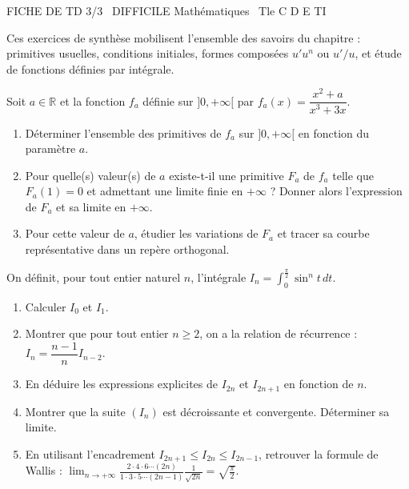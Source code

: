 \documentclass[11pt]{article}
\begin{document}
\begin{tcolorbox}[enhanced,colback=popink,colframe=popink,arc=10pt,boxrule=0pt,left=12pt,right=12pt,top=9pt,bottom=9pt]
{\color{white}\popxbold\small FICHE DE TD 3/3 \textbullet\ DIFFICILE \hfill Mathématiques \textbullet\ Tle C D E TI\par}
\end{tcolorbox}
\vspace{4pt}
Ces exercices de synthèse mobilisent l'ensemble des savoirs du chapitre : primitives usuelles, conditions initiales, formes composées $u'u^n$ ou $u'/u$, et étude de fonctions définies par intégrale.

\begin{exercice}
Soit $a \in \mathbb{R}$ et la fonction $f_a$ définie sur $]0, +\infty[$ par $f_a(x) = \dfrac{x^2 + a}{x^3 + 3x}$.
\begin{enumerate}
    \item Déterminer l'ensemble des primitives de $f_a$ sur $]0, +\infty[$ en fonction du paramètre $a$.
    \item Pour quelle(s) valeur(s) de $a$ existe-t-il une primitive $F_a$ de $f_a$ telle que $F_a(1) = 0$ et admettant une limite finie en $+\infty$ ? Donner alors l'expression de $F_a$ et sa limite en $+\infty$.
    \item Pour cette valeur de $a$, étudier les variations de $F_a$ et tracer sa courbe représentative dans un repère orthogonal.
\end{enumerate}
\end{exercice}

\begin{exercice}
On définit, pour tout entier naturel $n$, l'intégrale $I_n = \displaystyle\int_0^{\frac{\pi}{2}} \sin^n t \, dt$.
\begin{enumerate}
    \item Calculer $I_0$ et $I_1$.
    \item Montrer que pour tout entier $n \geq 2$, on a la relation de récurrence : $I_n = \dfrac{n-1}{n} I_{n-2}$.
    \item En déduire les expressions explicites de $I_{2n}$ et $I_{2n+1}$ en fonction de $n$.
    \item Montrer que la suite $(I_n)$ est décroissante et convergente. Déterminer sa limite.
    \item En utilisant l'encadrement $I_{2n+1} \leq I_{2n} \leq I_{2n-1}$, retrouver la formule de Wallis : $\displaystyle\lim_{n \to +\infty} \frac{2 \cdot 4 \cdot 6 \cdots (2n)}{1 \cdot 3 \cdot 5 \cdots (2n-1)} \frac{1}{\sqrt{2n}} = \sqrt{\frac{\pi}{2}}$.
\end{enumerate}
\end{exercice}
\end{document}
